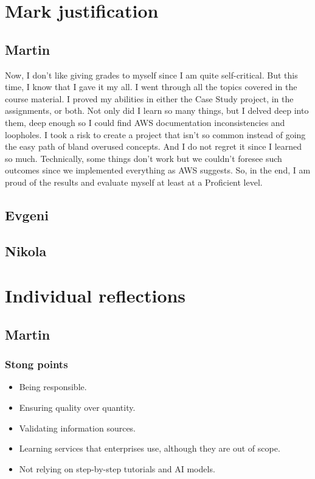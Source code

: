 \documentclass[10pt, a4paper]{article}
\begin{document}
\section{Mark justification}
\subsection{Martin}
Now, I don't like giving grades to myself since I am quite self-critical. But this time, I know that I gave it my all. I went through all the topics covered in the course material. I proved my abilities in either the Case Study project, in the assignments, or both. Not only did I learn so many things, but I delved deep into them, deep enough so I could find AWS documentation inconsistencies and loopholes. I took a risk to create a project that isn't so common instead of going the easy path of bland overused concepts. And I do not regret it since I learned so much. Technically, some things don't work but we couldn't foresee such outcomes since we implemented everything as AWS suggests. So, in the end, I am proud of the results and evaluate myself at least at a Proficient level.

\subsection{Evgeni}

\subsection{Nikola}

\section{Individual reflections}
\subsection{Martin}
\subsubsection{Stong points}
\begin{itemize}
	\item Being responsible.
	\item Ensuring quality over quantity.
	\item Validating information sources.
	\item Learning services that enterprises use, although they are out of scope.
	\item Not relying on step-by-step tutorials and AI models.
\end{itemize}
\end{document}

